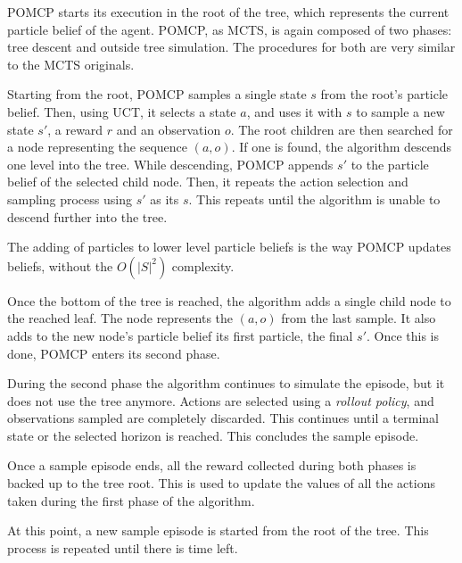 POMCP starts its execution in the root of the tree, which represents the current particle
belief of the agent. POMCP, as MCTS, is again composed of two phases: tree descent and outside tree
simulation. The procedures for both are very similar to the MCTS originals.

Starting from the root, POMCP samples a single state $s$ from the root's particle belief. Then,
using UCT, it selects a state $a$, and uses it with $s$ to sample a new state $s'$, a reward $r$ and
an observation $o$. The root children are then searched for a node representing the sequence
$(a,o)$. If one is found, the algorithm descends one level into the tree. While descending, POMCP
appends $s'$ to the particle belief of the selected child node. Then, it repeats the action
selection and sampling process using $s'$ as its $s$. This repeats until the algorithm is unable to
descend further into the tree.

The adding of particles to lower level particle beliefs is the way POMCP updates beliefs, without
the $O(|S|^2)$ complexity.

Once the bottom of the tree is reached, the algorithm adds a single child node to the reached leaf.
The node represents the $(a,o)$ from the last sample. It also adds to the new node's particle belief
its first particle, the final $s'$. Once this is done, POMCP enters its second phase.

During the second phase the algorithm continues to simulate the episode, but it does not use the
tree anymore. Actions are selected using a \textit{rollout policy}, and observations sampled are
completely discarded. This continues until a terminal state or the selected horizon is reached. This
concludes the sample episode.

Once a sample episode ends, all the reward collected during both phases is backed up to the tree
root. This is used to update the values of all the actions taken during the first phase of the
algorithm.

At this point, a new sample episode is started from the root of the tree. This process is repeated
until there is time left.
